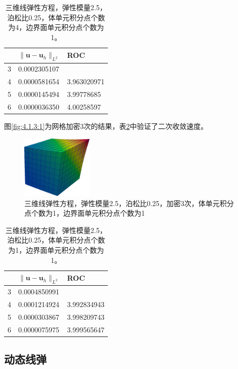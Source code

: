 \begin{table}[!htbp]
  \centering
  \begin{tabular}{c|l|l}
    & $\|\mathbf u-\mathbf u_h\|_{L^2}$ & ROC\\
    \hline
    3 & 0.0002305107    & \\
    \hline
    4 & 0.0000581654   & 3.963020971  \\
    \hline
    5 & 0.0000145494  &  3.99778685 \\
    \hline
    6 & 0.0000036350 &  4.00258597
  \end{tabular}
  \label{tab:4.1.3:1}
  \caption{三维线弹性方程，弹性模量2.5，泊松比0.25，体单元积分点个数为4，边界面单元积分点个数为1。}
\end{table}

图\ref{fig:4.1.3:1}为网格加密3次的结果，表\ref{tab:4.1.3:1}中验证了二次收敛速度。

\begin{figure}[!htbp]
  \centering
  \includegraphics[height=3cm]{fig/4/4.1.3:2.png}
  \caption{三维线弹性方程，弹性模量2.5，泊松比0.25，加密3次，体单元积分点个数为1，边界面单元积分点个数为1}
  \label{fig:4.1.3:2}
\end{figure}

\begin{table}[!htbp]
  \centering
  \begin{tabular}{c|l|l}
    & $\|\mathbf u-\mathbf u_h\|_{L^2}$ & ROC\\
    \hline
    3 &  0.0004850991   & \\
    \hline
    4 & 0.0001214924   &  3.992834943 \\
    \hline
    5 & 0.0000303867  &   3.998209743 \\
    \hline
    6 & 0.0000075975 &  3.999565647
  \end{tabular}
  \label{tab:4.1.3:1}
  \caption{三维线弹性方程，弹性模量2.5，泊松比0.25，体单元积分点个数为1，边界面单元积分点个数为1。}
\end{table}


\subsection{动态线弹}

